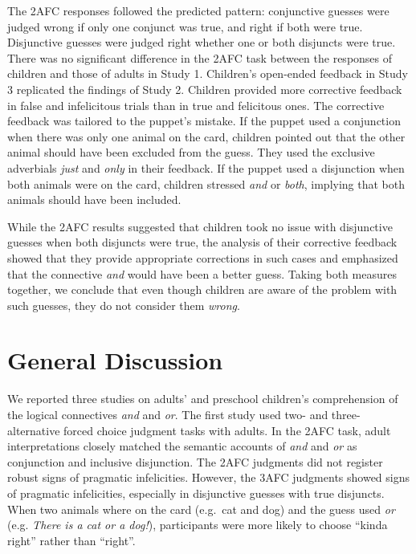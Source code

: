 \documentclass[floatsintext,man]{apa6}
\theoremstyle{definition}
\theoremstyle{definition}
\theoremstyle{definition}
\theoremstyle{remark}
\begin{document}
The 2AFC responses followed the predicted pattern: conjunctive guesses
were judged wrong if only one conjunct was true, and right if both were
true. Disjunctive guesses were judged right whether one or both
disjuncts were true. There was no significant difference in the 2AFC
task between the responses of children and those of adults in Study 1.
Children's open-ended feedback in Study 3 replicated the findings of
Study 2. Children provided more corrective feedback in false and
infelicitous trials than in true and felicitous ones. The corrective
feedback was tailored to the puppet's mistake. If the puppet used a
conjunction when there was only one animal on the card, children pointed
out that the other animal should have been excluded from the guess. They
used the exclusive adverbials \emph{just} and \emph{only} in their
feedback. If the puppet used a disjunction when both animals were on the
card, children stressed \emph{and} or \emph{both}, implying that both
animals should have been included.

While the 2AFC results suggested that children took no issue with
disjunctive guesses when both disjuncts were true, the analysis of their
corrective feedback showed that they provide appropriate corrections in
such cases and emphasized that the connective \emph{and} would have been
a better guess. Taking both measures together, we conclude that even
though children are aware of the problem with such guesses, they do not
consider them \emph{wrong}.

\section{General Discussion}\label{discussion}

We reported three studies on adults' and preschool children's
comprehension of the logical connectives \emph{and} and \emph{or}. The
first study used two- and three-alternative forced choice judgment tasks
with adults. In the 2AFC task, adult interpretations closely matched the
semantic accounts of \emph{and} and \emph{or} as conjunction and
inclusive disjunction. The 2AFC judgments did not register robust signs
of pragmatic infelicities. However, the 3AFC judgments showed signs of
pragmatic infelicities, especially in disjunctive guesses with true
disjuncts. When two animals where on the card (e.g.~cat and dog) and the
guess used \emph{or} (e.g. \emph{There is a cat or a dog!}),
participants were more likely to choose \enquote{kinda right} rather
than \enquote{right}.
\end{document}
